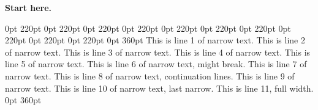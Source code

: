 \documentclass[a4paper,11pt]{article}
\begin{document}
\vspace*{3cm}
\noindent\textbf{Start here.}\par
 0pt 220pt 0pt 220pt 0pt 220pt 0pt 220pt 0pt 220pt 0pt 220pt 0pt 220pt 0pt 220pt 0pt 220pt 0pt 220pt 0pt 360pt
This is line 1 of narrow text.
This is line 2 of narrow text.
This is line 3 of narrow text.
This is line 4 of narrow text.
This is line 5 of narrow text.
This is line 6 of narrow text, might break.
This is line 7 of narrow text.
This is line 8 of narrow text, continuation lines.
This is line 9 of narrow text.
This is line 10 of narrow text, last narrow.
This is line 11, full width.
 0pt 360pt
\lipsum[1]%
\end{document}

